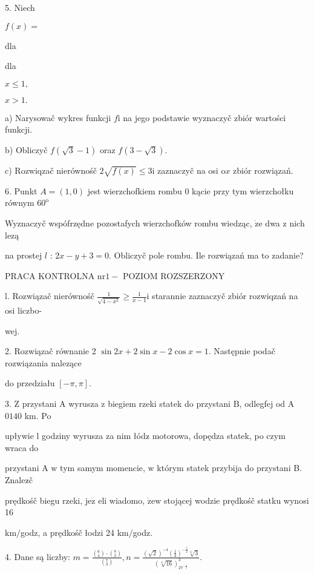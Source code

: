 \documentclass[a4paper,12pt]{article}
\begin{document}
5. Niech

$f(x)=$

dla

dla

$x\leq 1,$

$x>1.$

a) Narysowač wykres funkcji $f\mathrm{i}$ na jego podstawie wyznaczyč zbiór wartości funkcji.

b) Obliczyč $f(\sqrt{3}-1)$ oraz $f(3-\sqrt{3}).$

c) Rozwiqzač nierównośč $2\sqrt{f(x)}\leq 3\mathrm{i}$ zaznaczyč na osi $\mathrm{o}x$ zbiór rozwiązań.

6. Punkt $A=(1,0)$ jest wierzchofkiem rombu $0$ kącie przy tym wierzchołku równym $60^{\mathrm{o}}$

Wyznaczyč wspófrzędne pozostafych wierzchofków rombu wiedząc, $\dot{\mathrm{z}}\mathrm{e}$ dwa $\mathrm{z}$ nich lezą

na prostej $l$ : $2x-y+3=0$. Obliczyč pole rombu. Ile rozwiązań ma to zadanie?




PRACA KONTROLNA $\mathrm{n}\mathrm{r}1-$ POZIOM ROZSZERZONY

l. Rozwiązač nierównośč $\displaystyle \frac{1}{\sqrt{4-x^{2}}}\geq\frac{1}{x-1}\mathrm{i}$ starannie zaznaczyč zbiór rozwiqzań na osi liczbo-

wej.

2. Rozwiązač równanie 2 $\sin 2x+2\sin x-2\cos x=1$. Następnie podač rozwiązania nalezące

do przedziału $[-\pi,\pi].$

3. $\mathrm{Z}$ przystani A wyrusza $\mathrm{z}$ biegiem rzeki statek do przystani $\mathrm{B}$, odlegfej od A $0140$ km. Po

upływie l godziny wyrusza za nim łódz$\acute{}$ motorowa, dopędza statek, po czym wraca do

przystani A $\mathrm{w}$ tym samym momencie, $\mathrm{w}$ którym statek przybija do przystani B. Znalez$\acute{}$č

prędkośč biegu rzeki, $\mathrm{j}\mathrm{e}\dot{\mathrm{z}}$ eli wiadomo, $\dot{\mathrm{z}}\mathrm{e}\mathrm{w}$ stojącej wodzie prędkośč statku wynosi 16

$\mathrm{k}\mathrm{m}/$godz, a prędkośč łodzi 24 $\mathrm{k}\mathrm{m}/$godz.

4. Dane są liczby: $m=\displaystyle \frac{(_{4}^{6})\cdot(_{2}^{8})}{(_{3}^{7})}, n=\displaystyle \frac{(\sqrt{2})^{-4}(\frac{1}{4})^{-\frac{5}{2}}\sqrt[4]{3}}{(\sqrt[4]{16})_{27^{-\frac{1}{4}}}^{3}}.$
\end{document}
